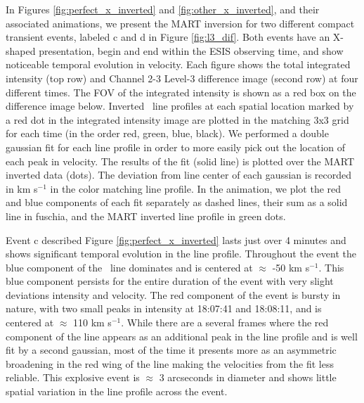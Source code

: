     	In Figures \ref{fig:perfect_x_inverted} and \ref{fig:other_x_inverted}, and their associated animations, we present the MART inversion for two different compact transient events, labeled c and d in Figure \ref{fig:l3_dif}.
    	Both events have an X-shaped presentation, begin and end within the ESIS observing time, and show noticeable temporal evolution in velocity.
		Each figure shows the total integrated intensity (top row) and Channel 2-3 Level-3 difference image (second row) at four different times.  
		The FOV of the integrated intensity is shown as a red box on the difference image below. 
		Inverted \ov \ line profiles at each spatial location marked by a red dot in the integrated intensity image are plotted in the matching 3x3 grid for each time (in the order red, green, blue, black).
		We performed a double gaussian fit for each line profile in order to more easily pick out the location of each peak in velocity.
		The results of the fit (solid line) is plotted over the MART inverted data (dots).
		The deviation from line center of each gaussian is recorded in km s$^{-1}$ in the color matching line profile.
		In the animation, we plot the red and blue components of each fit separately as dashed lines, their sum as a solid line in fuschia, and the MART inverted line profile in  green dots.
		
		Event c described Figure \ref{fig:perfect_x_inverted} lasts just over 4 minutes and shows significant temporal evolution in the line profile.
		Throughout the event the blue component of the \ov \ line dominates and is centered at $\approx$ -50 km s$^{-1}$.
		This blue component persists for the entire duration of the event with very slight deviations intensity and velocity.
		The red component of the event is bursty in nature, with two small peaks in intensity at 18:07:41 and 18:08:11, and is centered at $\approx$ 110 km s$^{-1}$.
		While there are a several frames where the red component of the line appears as an additional peak in the line profile and is well fit by a second gaussian, most of the time it presents more as an asymmetric broadening in the red wing of the line making the velocities from the fit less reliable.
		This explosive event is $\approx$ 3 arcseconds in diameter and shows little spatial variation in the line profile across the event.
		
